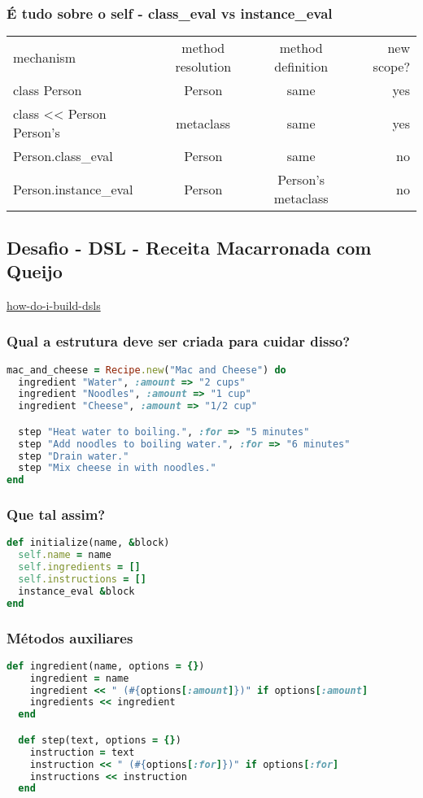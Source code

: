 \documentclass[serif,mathserif]{article}
\begin{document}
\subsubsection{É tudo sobre o self - class\_eval vs instance\_eval}
\begin{tabular}{ l | c | c |  r }
mechanism &	method resolution &	method definition &	new scope? \\
class Person &	Person &	same &	yes \\
class << Person	Person's & metaclass &	same &	yes\\
Person.class\_eval & Person & same & no\\
Person.instance\_eval & Person & Person's metaclass & no
\end{tabular}


\subsection {Desafio - DSL - Receita Macarronada com Queijo}

\href{http://rubylearning.com/blog/2010/11/30/how-do-i-build-dsls-with-yield-and-instance_eval/}{how-do-i-build-dsls}

\subsubsection{Qual a estrutura deve ser criada para cuidar disso?}
\begin{lstlisting}[language=ruby]
mac_and_cheese = Recipe.new("Mac and Cheese") do
  ingredient "Water", :amount => "2 cups"
  ingredient "Noodles", :amount => "1 cup"
  ingredient "Cheese", :amount => "1/2 cup"

  step "Heat water to boiling.", :for => "5 minutes"
  step "Add noodles to boiling water.", :for => "6 minutes"
  step "Drain water."
  step "Mix cheese in with noodles."
end
\end{lstlisting}

\subsubsection{Que tal assim?}
\begin{lstlisting}[language=ruby]
def initialize(name, &block)
  self.name = name
  self.ingredients = []
  self.instructions = []
  instance_eval &block
end
\end{lstlisting}

\subsubsection{Métodos auxiliares}
\begin{lstlisting}[language=ruby]
  def ingredient(name, options = {})
    ingredient = name
    ingredient << " (#{options[:amount]})" if options[:amount]
    ingredients << ingredient
  end

  def step(text, options = {})
    instruction = text
    instruction << " (#{options[:for]})" if options[:for]
    instructions << instruction
  end
\end{lstlisting}
\end{document}
